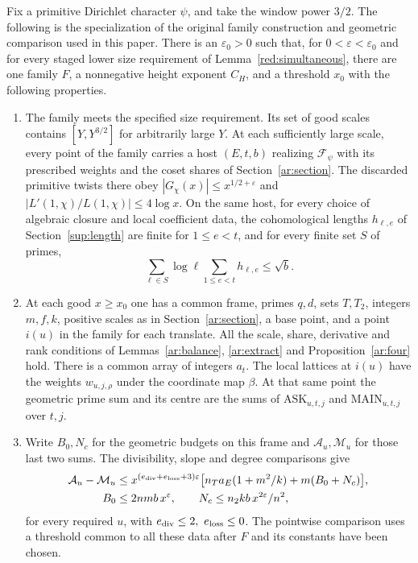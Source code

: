 \begin{formalinput}\label{red:design}
Fix a primitive Dirichlet character \(\psi\), and take the window
power \(3/2\). The following is the specialization of the original
family construction and geometric comparison used in this paper.
There is an \(\varepsilon_0>0\) such that, for
\(0<\varepsilon<\varepsilon_0\) and for every staged lower size
requirement of Lemma~\ref{red:simultaneous}, there are one
family \(F\), a nonnegative height exponent \(C_H\), and a threshold
\(x_0\) with the following properties.

\begin{enumerate}
\item The family meets the specified size requirement. Its set of
good scales contains \([Y,Y^{3/2}]\) for arbitrarily large \(Y\).
At each sufficiently large scale, every point of the family carries
a host \((E,t,b)\) realizing \(\mathcal F_\psi\) with its prescribed
weights and the coset shares of Section~\ref{ar:section}.
The discarded primitive twists there obey
\(|G_\chi(x)|\le x^{1/2+\varepsilon}\) and
\(|L'(1,\chi)/L(1,\chi)|\le4\log x\).
On the same host, for every choice of algebraic closure and local
coefficient data, the cohomological lengths
\(h_{\ell,e}\) of Section~\ref{sup:length} are finite for
\(1\le e<t\), and for every finite set \(S\) of primes,
\[
        \sum_{\ell\in S}\log\ell\sum_{1\le e<t}h_{\ell,e}
                \le\sqrt b .
\]
\item At each good \(x\ge x_0\) one has a common frame, primes \(q,d\),
sets \(T,T_2\), integers \(m,f,k\), positive scales as in
Section~\ref{ar:section}, a base point, and a point \(i(u)\) in
the family for each translate. All the scale, share, derivative
and rank conditions of Lemmas~\ref{ar:balance}, \ref{ar:extract}
and Proposition~\ref{ar:four} hold. There is a common array of
integers \(a_t\). The local lattices at \(i(u)\) have the weights
\(w_{u,j,\rho}\) under the coordinate map \(\beta\).
At that same point the geometric prime sum and its centre are
the sums of \(\mathrm{ASK}_{u,t,j}\) and
\(\mathrm{MAIN}_{u,t,j}\) over \(t,j\).
\item Write \(B_0,N_c\) for the geometric budgets on this frame and
\(\mathcal A_u,\mathcal M_u\) for those last two sums. The
divisibility, slope and degree comparisons give
\[
\begin{aligned}
 \mathcal A_u-\mathcal M_u
 &\le x^{(e_{\rm div}+e_{\rm loss}+3)\varepsilon}
       \big[n_T a_E(1+m^2/k)+m(B_0+N_c)\big],\\
 B_0&\le2nmb\,x^\varepsilon,\qquad
 N_c\le n_2 k b\,x^{2\varepsilon}/n^2 ,
\end{aligned}
\]
for every required \(u\), with \(e_{\rm div}\le2,\ e_{\rm loss}\le0\).
The pointwise comparison uses a threshold common to all these data
after \(F\) and its constants have been chosen.
\end{enumerate}
\end{formalinput}

